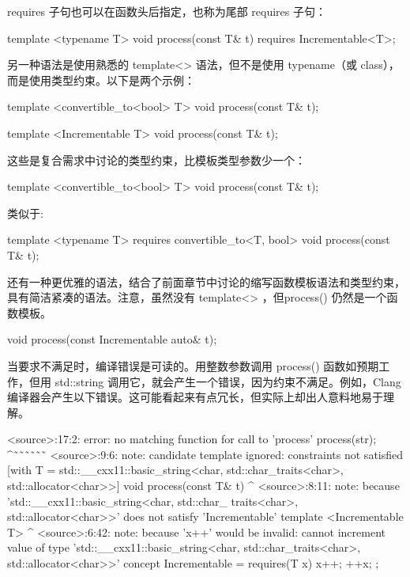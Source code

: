 requires 子句也可以在函数头后指定，也称为尾部 requires 子句：

\begin{cpp}
template <typename T>
void process(const T& t) requires Incrementable<T>;
\end{cpp}

另一种语法是使用熟悉的 template<> 语法，但不是使用 typename（或 class），而是使用类型约束。以下是两个示例：

\begin{cpp}
template <convertible_to<bool> T>
void process(const T& t);

template <Incrementable T>
void process(const T& t);
\end{cpp}

这些是复合需求中讨论的类型约束，比模板类型参数少一个：

\begin{cpp}
template <convertible_to<bool> T>
void process(const T& t);
\end{cpp}

类似于:

\begin{cpp}
template <typename T> requires convertible_to<T, bool>
void process(const T& t);
\end{cpp}

还有一种更优雅的语法，结合了前面章节中讨论的缩写函数模板语法和类型约束，具有简洁紧凑的语法。注意，虽然没有 template<> ，但process() 仍然是一个函数模板。

\begin{cpp}
void process(const Incrementable auto& t);
\end{cpp}

当要求不满足时，编译错误是可读的。用整数参数调用 process() 函数如预期工作，但用 std::string 调用它，就会产生一个错误，因为约束不满足。例如，Clang 编译器会产生以下错误。这可能看起来有点冗长，但实际上却出人意料地易于理解。

\begin{shell}
<source>:17:2: error: no matching function for call to 'process'
        process(str);
        ^˜˜˜˜˜˜
<source>:9:6: note: candidate template ignored: constraints not satisfied [with T =
std::__cxx11::basic_string<char, std::char_traits<char>, std::allocator<char>>]
void process(const T& t)
     ^
<source>:8:11: note: because 'std::__cxx11::basic_string<char, std::char_
traits<char>, std::allocator<char>>' does not satisfy 'Incrementable'
template <Incrementable T>
          ^
<source>:6:42: note: because 'x++' would be invalid: cannot increment value of type
'std::__cxx11::basic_string<char, std::char_traits<char>, std::allocator<char>>'
concept Incrementable = requires(T x) { x++; ++x; };
\end{shell}

